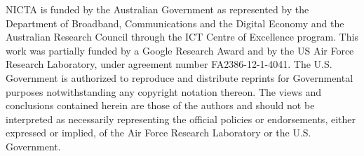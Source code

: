 NICTA is funded by the Australian Government as represented by
the Department of Broadband, Communications and the Digital Economy
and the Australian Research Council through the ICT Centre of
Excellence program.  This work was partially funded by a Google
Research Award and by the US Air Force Research Laboratory, under
agreement number FA2386-12-1-4041. The U.S.  Government is authorized
to reproduce and distribute reprints for Governmental purposes
notwithstanding any copyright notation thereon. The views and
conclusions contained herein are those of the authors and should not
be interpreted as necessarily representing the official policies or
endorsements, either expressed or implied, of the Air Force Research
Laboratory or the U.S. Government.  
